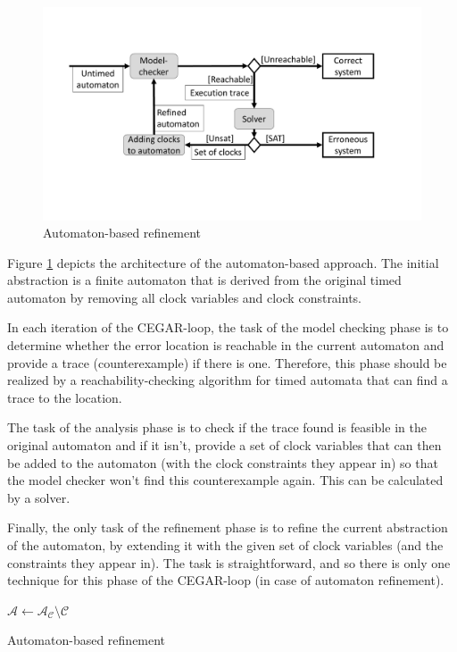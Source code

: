 \begin{figure} 
	\centering
	\includegraphics[width=.7\textwidth]{include/figures/alg_arch_ta}%
	\caption{Automaton-based refinement}%
	\label{fig:cegaraut}%
\end{figure}

Figure \ref{fig:cegaraut} depicts the architecture of the automaton-based approach. The initial abstraction is a finite automaton that is derived from the original timed automaton by removing all clock variables and clock constraints. 

In each iteration of the CEGAR-loop, the task of the model checking phase is to determine whether the error location is reachable in the current automaton and provide a trace (counterexample) if there is one. Therefore, this phase should be realized by a reachability-checking algorithm for timed automata that can find a trace to the location.

The task of the analysis phase is to check if the trace found is feasible in the original automaton and if it isn't, provide a set of clock variables that can then be added to the automaton (with the clock constraints they appear in) so that the model checker won't find this counterexample again. This can be calculated by a solver.

Finally, the only task of the refinement phase is to refine the current abstraction of the automaton, by extending it with the given set of clock variables (and the constraints they appear in). The task is straightforward, and so there is only one technique for this phase of the CEGAR-loop (in case of automaton refinement).

\begin{algorithm}
	\BlankLine
	$\mathcal{A} \leftarrow \mathcal{A}_\mathcal{C} \setminus \mathcal{C}$  
	\caption{Automaton-based refinement} \label{alg:ceraraut}
\end{algorithm}


